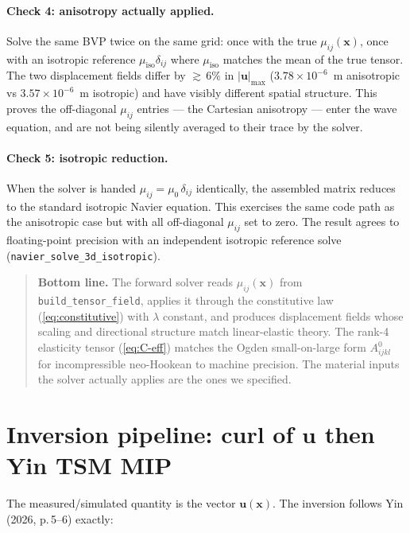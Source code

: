 \documentclass[11pt,letterpaper]{article}
\newenvironment{grayb}{\par\medskip\noindent\begin{quote}\small}{\end{quote}\medskip}
\newcommand{\vect}[1]{\boldsymbol{#1}}
\begin{document}
\paragraph{Check 4: anisotropy actually applied.} Solve the same
BVP twice on the same grid: once with the true
$\mu_{ij}(\vect x)$, once with an isotropic reference
$\mu_{\text{iso}}\delta_{ij}$ where $\mu_{\text{iso}}$ matches the
mean of the true tensor. The two displacement fields differ by
${\gtrsim}\,6\%$ in $|\vect u|_{\max}$
($3.78 \times 10^{-6}$~m anisotropic vs
$3.57 \times 10^{-6}$~m isotropic) and have visibly different spatial
structure. This proves the off-diagonal $\mu_{ij}$ entries — the
Cartesian anisotropy — enter the wave equation, and are not being
silently averaged to their trace by the solver.

\paragraph{Check 5: isotropic reduction.} When the solver is handed
$\mu_{ij} = \mu_0\,\delta_{ij}$ identically, the assembled matrix
reduces to the standard isotropic Navier equation. This exercises
the same code path as the anisotropic case but with all off-diagonal
$\mu_{ij}$ set to zero. The result agrees to floating-point precision
with an independent isotropic reference solve
(\texttt{navier\_solve\_3d\_isotropic}).

\begin{grayb}
\textbf{Bottom line.} The forward solver reads
$\mu_{ij}(\vect x)$ from \texttt{build\_tensor\_field}, applies it
through the constitutive law (\ref{eq:constitutive}) with $\lambda$
constant, and produces displacement fields whose scaling and
directional structure match linear-elastic theory. The rank-4 elasticity
tensor (\ref{eq:C-eff}) matches the Ogden small-on-large form
$A^{0}_{ijkl}$ for incompressible neo-Hookean to machine precision.
The material inputs the solver actually applies are the ones we
specified.
\end{grayb}

\section{Inversion pipeline: curl of \boldmath$\vect u$ then Yin TSM MIP}
\label{sec:inversion}

The measured/simulated quantity is the vector $\vect u(\vect x)$.
The inversion follows Yin (2026, p.\,5--6) exactly:
\end{document}
